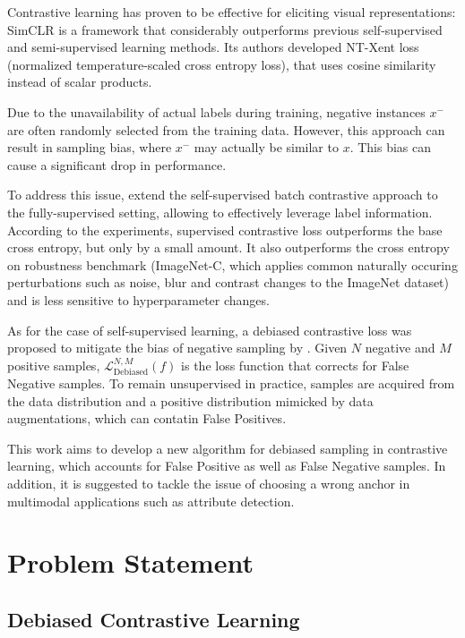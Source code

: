 \documentclass{article}
\begin{document}
Contrastive learning has proven to be effective for eliciting visual representations: SimCLR  \citep{Chen2020SimCLR} is a framework that considerably outperforms previous self-supervised and semi-supervised learning methods. Its authors developed NT-Xent loss (normalized temperature-scaled cross entropy loss), that uses cosine similarity instead of scalar products.

Due to the unavailability of actual labels during training, negative instances $x^-$ are often randomly selected from the training data. However, this approach can result in sampling bias, where $x^-$ may actually be similar to $x$. This bias can cause a significant drop in performance. 

To address this issue, \citep{khosla2021supervised} extend the self-supervised batch contrastive approach to the fully-supervised setting, allowing to effectively leverage label information. According to the experiments, supervised contrastive loss outperforms the base cross entropy, but only by a small amount. It also outperforms the cross entropy on robustness benchmark (ImageNet-C, which applies common naturally occuring perturbations such as noise, blur and contrast changes to the ImageNet dataset) and is less sensitive to hyperparameter changes.

As for the case of self-supervised learning, a debiased contrastive loss was proposed to mitigate the bias of negative sampling by \citep{chuang2021debiased}. Given $N$ negative and $M$ positive samples, $\mathcal{L}^{N, M}_{\text{Debiased}} (f)$ is the loss function that corrects for False Negative samples. To remain unsupervised in practice, samples are acquired from the data distribution and a positive distribution mimicked by data augmentations, which can contatin False Positives.

This work aims to develop a new algorithm for debiased sampling in contrastive learning, which accounts for False Positive as well as False Negative samples. In addition, it is suggested to tackle the issue of choosing a wrong anchor in multimodal applications such as attribute detection.



\section{Problem Statement}
\label{sec:headings}

\subsection{Debiased Contrastive Learning}
\end{document}
